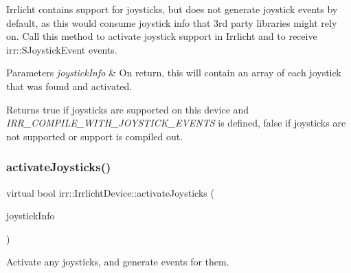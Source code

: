 Irrlicht contains support for joysticks, but does not generate joystick events by default, as this would consume joystick info that 3rd party libraries might rely on. Call this method to activate joystick support in Irrlicht and to receive irr\+::\+S\+Joystick\+Event events. 
\begin{DoxyParams}{Parameters}
{\em joystick\+Info} & On return, this will contain an array of each joystick that was found and activated. \\
\hline
\end{DoxyParams}
\begin{DoxyReturn}{Returns}
true if joysticks are supported on this device and {\itshape I\+R\+R\+\_\+\+C\+O\+M\+P\+I\+L\+E\+\_\+\+W\+I\+T\+H\+\_\+\+J\+O\+Y\+S\+T\+I\+C\+K\+\_\+\+E\+V\+E\+N\+TS} is defined, false if joysticks are not supported or support is compiled out. 
\end{DoxyReturn}
\mbox{\label{classirr_1_1IrrlichtDevice_af06f8d2c4fdffd1f879e46685bcbc6e3}} 
\subsubsection{\texorpdfstring{activate\+Joysticks()}{activateJoysticks()}\hspace{0.1cm}{\footnotesize\ttfamily [2/2]}}
{\footnotesize\ttfamily virtual bool irr\+::\+Irrlicht\+Device\+::activate\+Joysticks (\begin{DoxyParamCaption}\item[{\hyperlink{classirr_1_1core_1_1array}{core\+::array}$<$ \hyperlink{structirr_1_1SJoystickInfo}{S\+Joystick\+Info} $>$ \&}]{joystick\+Info }\end{DoxyParamCaption})\hspace{0.3cm}{\ttfamily [pure virtual]}}



Activate any joysticks, and generate events for them. 

